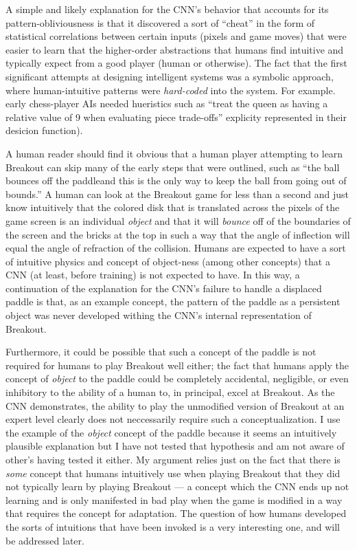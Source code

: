 \documentclass{article}
\renewcommand{\it}{\textit}
\begin{document}
A simple and likely explanation for the CNN's behavior that accounts for its pattern-obliviousness is that it discovered a sort of ``cheat'' in the form of statistical correlations between certain inputs (pixels and game moves) that were easier to learn that the higher-order abstractions that humans find intuitive and typically expect from a good player (human or otherwise).
The fact that the first significant attempts at designing intelligent systems was a symbolic approach, where human-intuitive patterns were \it{hard-coded} into the system. For example. early chess-player AIs needed hueristics such as ``treat the queen as having a relative value of 9 when evaluating piece trade-offs'' explicity represented in their desicion function).

A human reader should find it obvious that a human player attempting to learn Breakout can skip many of the early steps that were outlined, such as ``the ball bounces off the paddleand this is the only way to keep the ball from going out of bounds.''
A human can look at the Breakout game for less than a second and just know intuitively that the colored disk that is translated across the pixels of the game screen is an individual \it{object} and that it will \it{bounce} off of the boundaries of the screen and the bricks at the top in such a way that the angle of inflection will equal the angle of refraction of the collision.
Humans are expected to have a sort of intuitive physics and concept of object-ness (among other concepts) that a CNN (at least, before training) is not expected to have.
In this way, a continuation of the explanation for the CNN's failure to handle a displaced paddle is that, as an example concept, the pattern of the paddle as a persistent object was never developed withing the CNN's internal representation of Breakout.

Furthermore, it could be possible that such a concept of the paddle is not required for humans to play Breakout well either; the fact that humans apply the concept of \it{object} to the paddle could be completely accidental, negligible, or even inhibitory to the ability of a human to, in principal, excel at Breakout.
As the CNN demonstrates, the ability to play the unmodified version of Breakout at an expert level clearly does not neccessarily require such a conceptualization.
I use the example of the \it{object} concept of the paddle because it seems an intuitively plausible explanation but I have not tested that hypothesis and am not aware of other's having tested it either. My argument relies just on the fact that there is \it{some} concept that humans intuitively use when playing Breakout that they did not typically learn by playing Breakout --- a concept which the CNN ends up not learning and is only manifested in bad play when the game is modified in a way that requires the concept for adaptation.
The question of how humans developed the sorts of intuitions that have been invoked is a very interesting one, and will be addressed later.
\end{document}
